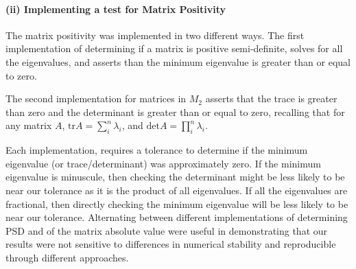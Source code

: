 \paragraph{\textbf{(ii) Implementing a test for Matrix Positivity}} The matrix positivity was implemented in two different ways. The first implementation of determining if a matrix is positive semi-definite, solves for all the eigenvalues, and asserts than the minimum eigenvalue is greater than or equal to zero.
\begin{algorithm}
    \caption{Check Matrix Positivity (Eigenvalues), \texttt{matrix\_positivity()}}
    \begin{algorithmic}[1]
        \ELSE{}
        \ENDIF{}
    \end{algorithmic}
\end{algorithm}
The second implementation for matrices in $M_2$ asserts that the trace is greater than zero and the determinant is greater than or equal to zero, recalling that for any matrix $A$, $\text{tr} A = \sum_{i}^{n} \lambda_i$, and $\text{det} A = \prod_{i}^{n} \lambda_i$. \begin{algorithm}
    \caption{Check Matrix Positivity of $M_2$ (Trace and Determinant), \texttt{matrix\_positivity()}}
    \begin{algorithmic}[1]
        \ELSE{}
        \ENDIF{}
    \end{algorithmic}
\end{algorithm}
Each implementation, requires a tolerance to determine if the minimum eigenvalue (or trace/determinant) was approximately zero. If the minimum eigenvalue is minuscule, then checking the determinant might be less likely to be near our tolerance as it is the product of all eigenvalues. If all the eigenvalues are fractional, then directly checking the minimum eigenvalue will be less likely to be near our tolerance. Alternating between different implementations of determining PSD and of the matrix absolute value were useful in demonstrating that our results were not sensitive to differences in numerical stability and reproducible through different approaches.